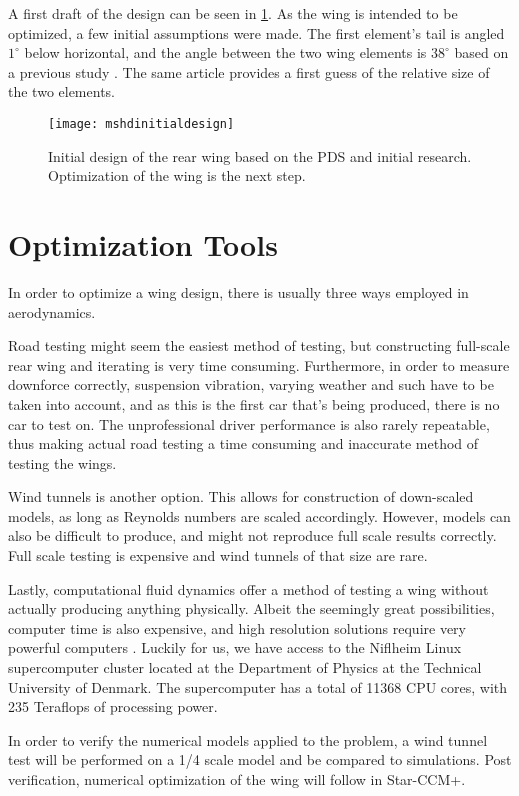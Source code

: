     A first draft of the design can be seen in \ref{fig:firstdraftwing}. As the wing is intended to be optimized, a few initial assumptions were made. The first element's tail is angled $1^\circ$ below horizontal, and the angle between the two wing elements is $38^\circ$ based on a previous study \cite{winginitialangle}. The same article provides a first guess of the relative size of the two elements.

    \begin{figure}
      \texttt{[image: mshdinitialdesign]}
      \caption{Initial design of the rear wing based on the PDS and initial research. Optimization of the wing is the next step.}
      \label{fig:firstdraftwing}
    \end{figure}

  \section{Optimization Tools}

    In order to optimize a wing design, there is usually three ways employed in aerodynamics.

    Road testing might seem the easiest method of testing, but constructing full-scale rear wing and iterating is very time consuming. Furthermore, in order to measure downforce correctly, suspension vibration, varying weather and such have to be taken into account, and as this is the first car that's being produced, there is no car to test on. The unprofessional driver performance is also rarely repeatable, thus making actual road testing a time consuming and inaccurate method of testing the wings.

    Wind tunnels is another option. This allows for construction of down-scaled models, as long as Reynolds numbers are scaled accordingly. However, models can also be difficult to produce, and might not reproduce full scale results correctly. Full scale testing is expensive and wind tunnels of that size are rare.

    Lastly, computational fluid dynamics offer a method of testing a wing without actually producing anything physically. Albeit the seemingly great possibilities, computer time is also expensive, and high resolution solutions require very powerful computers \cite{jkatz}. Luckily for us, we have access to the Niflheim Linux supercomputer cluster located at the Department of Physics at the Technical University of Denmark. The supercomputer has a total of 11368 CPU cores, with 235 Teraflops of processing power.

    In order to verify the numerical models applied to the problem, a wind tunnel test will be performed on a 1/4 scale model and be compared to simulations. Post verification, numerical optimization of the wing will follow in Star-CCM+.
